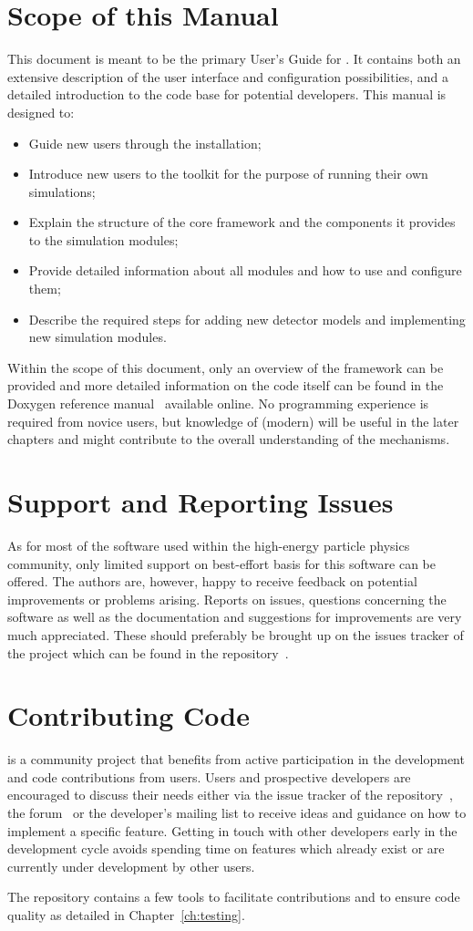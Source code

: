 \section{Scope of this Manual}
This document is meant to be the primary User's Guide for \apsq.
It contains both an extensive description of the user interface and configuration possibilities, and a detailed introduction to the code base for potential developers.
This manual is designed to:
\begin{itemize}
\item Guide new users through the installation;
\item Introduce new users to the toolkit for the purpose of running their own simulations;
\item Explain the structure of the core framework and the components it provides to the simulation modules;
\item Provide detailed information about all modules and how to use and configure them;
\item Describe the required steps for adding new detector models and implementing new simulation modules.
\end{itemize}

Within the scope of this document, only an overview of the framework can be provided and more detailed information on the code itself can be found in the Doxygen reference manual~\cite{ap2-doxygen} available online.
No programming experience is required from novice users, but knowledge of (modern) \CPP will be useful in the later chapters and might contribute to the overall understanding of the mechanisms.

\section{Support and Reporting Issues}
As for most of the software used within the high-energy particle physics community, only limited support on best-effort basis for this software can be offered.
The authors are, however, happy to receive feedback on potential improvements or problems arising.
Reports on issues, questions concerning the software as well as the documentation and suggestions for improvements are very much appreciated.
These should preferably be brought up on the issues tracker of the project which can be found in the repository~\cite{ap2-issue-tracker}.


\section{Contributing Code}
\apsq is a community project that benefits from active participation in the development and code contributions from users.
Users and prospective developers are encouraged to discuss their needs either via the issue tracker of the repository~\cite{ap2-issue-tracker}, the \apsq forum~\cite{ap2-forum} or the developer's mailing list to receive ideas and guidance on how to implement a specific feature.
Getting in touch with other developers early in the development cycle avoids spending time on features which already exist or are currently under development by other users.

The repository contains a few tools to facilitate contributions and to ensure code quality as detailed in Chapter~\ref{ch:testing}.
